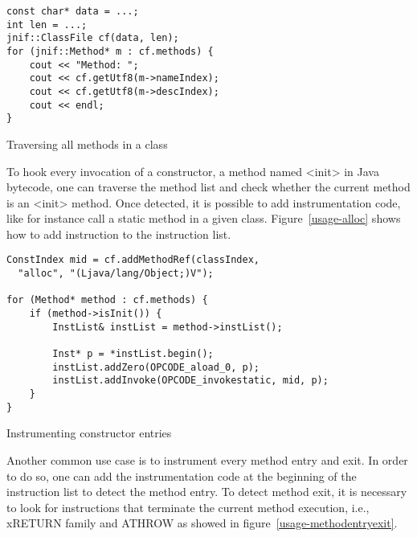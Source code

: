 \begin{listing}
\begin{verbatim}
const char* data = ...;
int len = ...;
jnif::ClassFile cf(data, len);
for (jnif::Method* m : cf.methods) {
	cout << "Method: ";
	cout << cf.getUtf8(m->nameIndex);
	cout << cf.getUtf8(m->descIndex);
	cout << endl;
}
\end{verbatim}
\caption{Traversing all methods in a class}
\label{usage-print}
\end{listing}

To hook every invocation of a constructor, a method named <init> in Java bytecode, 
one can traverse the method list and check whether the current method is an <init> method. 
Once detected, it is possible to add instrumentation code, like for instance call a static method in a given class. 
Figure~\ref{usage-alloc} shows how to add instruction to the instruction list.

\begin{listing}
\begin{verbatim}
ConstIndex mid = cf.addMethodRef(classIndex, 
  "alloc", "(Ljava/lang/Object;)V");

for (Method* method : cf.methods) {
	if (method->isInit()) {
		InstList& instList = method->instList();

		Inst* p = *instList.begin();
		instList.addZero(OPCODE_aload_0, p);
		instList.addInvoke(OPCODE_invokestatic, mid, p);
	}
}
\end{verbatim}
\caption{Instrumenting constructor entries}
\label{usage-alloc}
\end{listing}

Another common use case is to instrument every method entry and exit. In order to do so, one can add the instrumentation code at the beginning of the instruction list to detect the method entry. To detect method exit, it is necessary to look for instructions that terminate the current method execution, i.e., xRETURN family and ATHROW as showed in figure~\ref{usage-methodentryexit}.

